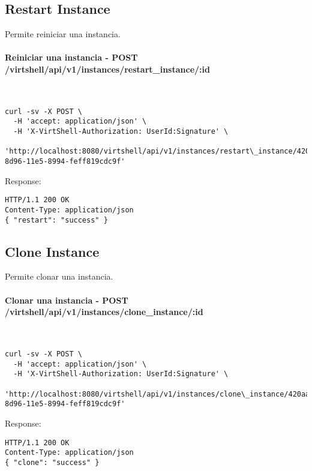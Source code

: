 \subsection{Restart Instance}

Permite reiniciar una instancia.

\paragraph{Reiniciar una instancia - POST /virtshell/api/v1/instances/restart\_instance/:id} ~\\

\begin{lstlisting}[style=json]
curl -sv -X POST \
  -H 'accept: application/json' \
  -H 'X-VirtShell-Authorization: UserId:Signature' \
   'http://localhost:8080/virtshell/api/v1/instances/restart\_instance/420aa3f0-8d96-11e5-8994-feff819cdc9f'
\end{lstlisting}

Response:

\begin{lstlisting}[style=json]
HTTP/1.1 200 OK
Content-Type: application/json
{ "restart": "success" }
\end{lstlisting}


\subsection{Clone Instance}

Permite clonar una instancia.

\paragraph{Clonar una instancia - POST /virtshell/api/v1/instances/clone\_instance/:id} ~\\

\begin{lstlisting}[style=json]
curl -sv -X POST \
  -H 'accept: application/json' \
  -H 'X-VirtShell-Authorization: UserId:Signature' \
   'http://localhost:8080/virtshell/api/v1/instances/clone\_instance/420aa3f0-8d96-11e5-8994-feff819cdc9f'
\end{lstlisting}

Response:

\begin{lstlisting}[style=json]
HTTP/1.1 200 OK
Content-Type: application/json
{ "clone": "success" }
\end{lstlisting}


